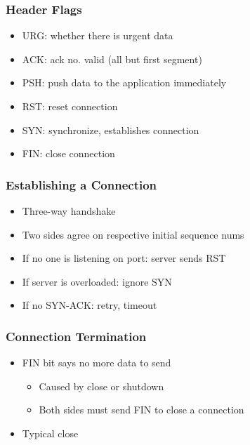\subsubsection{Header Flags}
\begin{itemize}[nosep]
    \item URG: whether there is urgent data
    \item ACK: ack no. valid (all but first segment)
    \item PSH: push data to the application immediately
    \item RST: reset connection
    \item SYN: synchronize, establishes connection
    \item FIN: close connection
\end{itemize}

\subsubsection{Establishing a Connection}
\begin{itemize}[nosep]
    \item Three-way handshake
    \item Two sides agree on respective initial sequence nums
    \item If no one is listening on port: server sends RST
    \item If server is overloaded: ignore SYN
    \item If no SYN-ACK: retry, timeout
\end{itemize}

\subsubsection{Connection Termination}
\begin{itemize}[nosep]
    \item FIN bit says no more data to send
          \begin{itemize}[nosep]
              \item Caused by close or shutdown
              \item Both sides must send FIN to close a connection
          \end{itemize}
    \item Typical close
\end{itemize}

